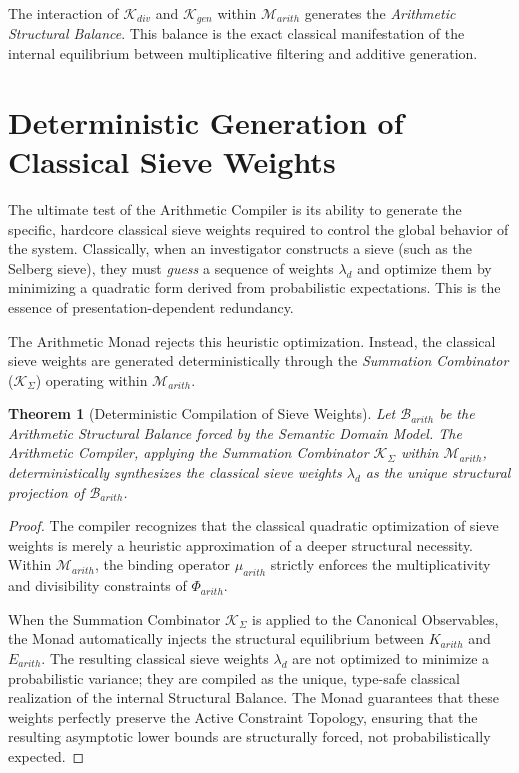 \documentclass[12pt,openany]{extbook}
\theoremstyle{plain}
\newtheorem{theorem}{Theorem}[chapter]
\theoremstyle{definition}
\begin{document}
The interaction of $\mathcal{K}_{div}$ and $\mathcal{K}_{gen}$ within $\mathcal{M}_{arith}$ generates the \emph{Arithmetic Structural Balance}. This balance is the exact classical manifestation of the internal equilibrium between multiplicative filtering and additive generation.

\section{Deterministic Generation of Classical Sieve Weights}

The ultimate test of the Arithmetic Compiler is its ability to generate the specific, hardcore classical sieve weights required to control the global behavior of the system. Classically, when an investigator constructs a sieve (such as the Selberg sieve), they must \emph{guess} a sequence of weights $\lambda_d$ and optimize them by minimizing a quadratic form derived from probabilistic expectations. This is the essence of presentation-dependent redundancy.

The Arithmetic Monad rejects this heuristic optimization. Instead, the classical sieve weights are generated deterministically through the \emph{Summation Combinator} ($\mathcal{K}_{\Sigma}$) operating within $\mathcal{M}_{arith}$.

\begin{theorem}[Deterministic Compilation of Sieve Weights]
Let $\mathcal{B}_{arith}$ be the Arithmetic Structural Balance forced by the Semantic Domain Model. The Arithmetic Compiler, applying the Summation Combinator $\mathcal{K}_{\Sigma}$ within $\mathcal{M}_{arith}$, deterministically synthesizes the classical sieve weights $\lambda_d$ as the unique structural projection of $\mathcal{B}_{arith}$.
\end{theorem}

\begin{proof}
The compiler recognizes that the classical quadratic optimization of sieve weights is merely a heuristic approximation of a deeper structural necessity. Within $\mathcal{M}_{arith}$, the binding operator $\mu_{arith}$ strictly enforces the multiplicativity and divisibility constraints of $\Phi_{arith}$. 

When the Summation Combinator $\mathcal{K}_{\Sigma}$ is applied to the Canonical Observables, the Monad automatically injects the structural equilibrium between $K_{arith}$ and $E_{arith}$. The resulting classical sieve weights $\lambda_d$ are not optimized to minimize a probabilistic variance; they are compiled as the unique, type-safe classical realization of the internal Structural Balance. The Monad guarantees that these weights perfectly preserve the Active Constraint Topology, ensuring that the resulting asymptotic lower bounds are structurally forced, not probabilistically expected.
\end{proof}
\end{document}
